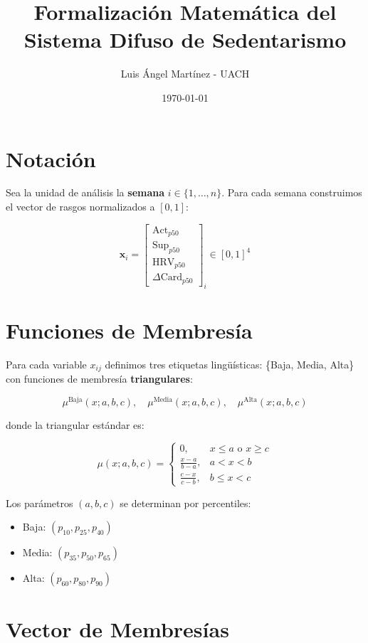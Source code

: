 \documentclass[12pt]{article}
\title{Formalización Matemática del Sistema Difuso de Sedentarismo}
\author{Luis Ángel Martínez - UACH}
\date{\today}
\begin{document}
\maketitle

\section{Notación}

Sea la unidad de análisis la \textbf{semana} $i \in \{1, \dots, n\}$. Para cada semana construimos el vector de rasgos normalizados a $[0,1]$:

\[
\mathbf{x}_i = \begin{bmatrix}
\text{Act}_{p50} \\
\text{Sup}_{p50} \\
\text{HRV}_{p50} \\
\Delta\text{Card}_{p50}
\end{bmatrix}_i \in [0,1]^4
\]

\section{Funciones de Membresía}

Para cada variable $x_{ij}$ definimos tres etiquetas lingüísticas: \{Baja, Media, Alta\} con funciones de membresía \textbf{triangulares}:

\[
\mu^{\text{Baja}}(x; a, b, c), \quad \mu^{\text{Media}}(x; a, b, c), \quad \mu^{\text{Alta}}(x; a, b, c)
\]

donde la triangular estándar es:

\[
\mu(x; a, b, c) = \begin{cases}
0, & x \le a \text{ o } x \ge c \\
\frac{x - a}{b - a}, & a < x < b \\
\frac{c - x}{c - b}, & b \le x < c
\end{cases}
\]

Los parámetros $(a, b, c)$ se determinan por percentiles:
\begin{itemize}
    \item Baja: $(p_{10}, p_{25}, p_{40})$
    \item Media: $(p_{35}, p_{50}, p_{65})$
    \item Alta: $(p_{60}, p_{80}, p_{90})$
\end{itemize}

\section{Vector de Membresías}
\end{document}
